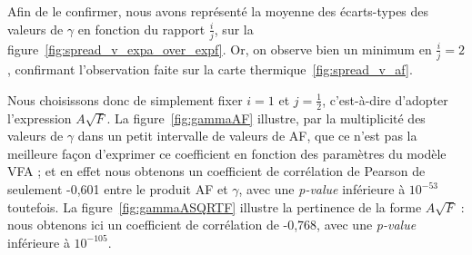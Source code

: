 	Afin de le confirmer, nous avons représenté la moyenne des écarts-types des valeurs de $\gamma$ en fonction du rapport $\frac{i}{j}$, sur la figure~\ref{fig:spread_v_expa_over_expf}. Or, on observe bien un minimum en $\frac{i}{j} = 2$, confirmant l'observation faite sur la carte thermique~\ref{fig:spread_v_af}.
		
	Nous choisissons donc de simplement fixer $i = 1$ et $j = \frac{1}{2}$, c'est-à-dire d'adopter l'expression $A\sqrt{F}$. La figure~\ref{fig:gammaAF} illustre, par la multiplicité des valeurs de $\gamma$ dans un petit intervalle de valeurs de AF, que ce n'est pas la meilleure façon d'exprimer ce coefficient en fonction des paramètres du modèle VFA ; et en effet nous obtenons un coefficient de corrélation de Pearson de seulement -0,601 entre le produit AF et $\gamma$, avec une \emph{p-value} inférieure à $10^{-53}$ toutefois. La figure~\ref{fig:gammaASQRTF} illustre la pertinence de la forme $A\sqrt{F}$ : nous obtenons ici un coefficient de corrélation de -0,768, avec une \emph{p-value} inférieure à $10^{-105}$.
	
